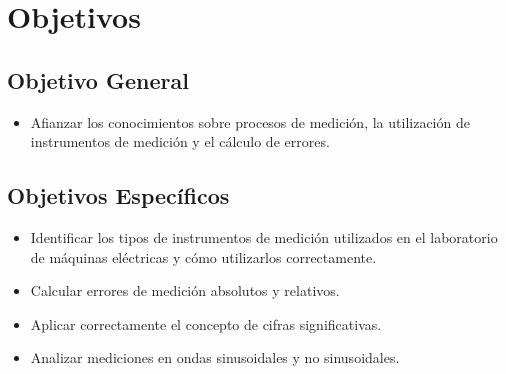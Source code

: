 \section{Objetivos}

\subsection*{Objetivo General}
\begin{itemize}
    \item Afianzar los conocimientos sobre procesos de medición, la utilización de instrumentos de medición y el cálculo de errores.
\end{itemize}

\subsection*{Objetivos Específicos}
\begin{itemize}
    \item Identificar los tipos de instrumentos de medición utilizados en el laboratorio de máquinas eléctricas y cómo utilizarlos correctamente.
    \item Calcular errores de medición absolutos y relativos.
    \item Aplicar correctamente el concepto de cifras significativas.
    \item Analizar mediciones en ondas sinusoidales y no sinusoidales.
\end{itemize}
